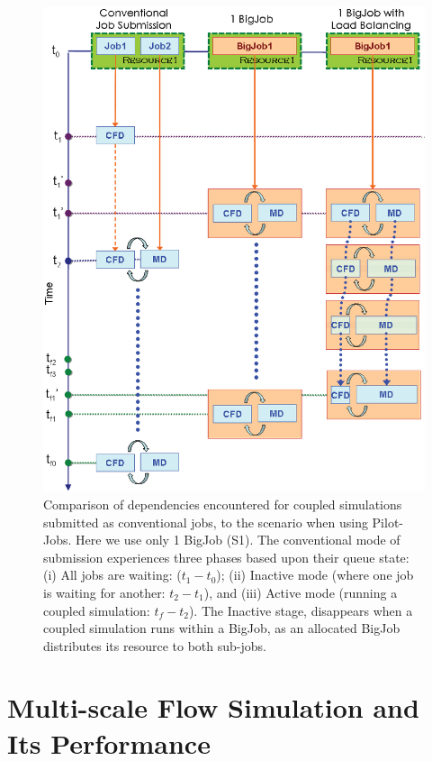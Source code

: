 \documentclass[preprint,12pt]{elsarticle}
\begin{document}
\begin{figure}
\centering
\includegraphics[width=0.8\linewidth]{Simulation_Time_of_One_BigJob.eps}
\caption{\small Comparison of dependencies encountered for coupled
  simulations submitted as conventional jobs, to the scenario when
  using Pilot-Jobs. Here we use only 1 BigJob (S1). The conventional
  mode of submission experiences three phases based upon their queue
  state: (i) All jobs are waiting: ($t_1-t_0$); (ii) Inactive mode
  (where one job is waiting for another: $t_2-t_1$), and (iii) Active
  mode (running a coupled simulation: $t_f-t_2$). The Inactive stage,
  disappears when a coupled simulation runs within a BigJob, as an
  allocated BigJob distributes its resource to both sub-jobs.}
\label{Fig:OneBJ_Flow}
\vspace{-1em}
\end{figure}



\section{Multi-scale Flow Simulation and Its Performance}
\end{document}
